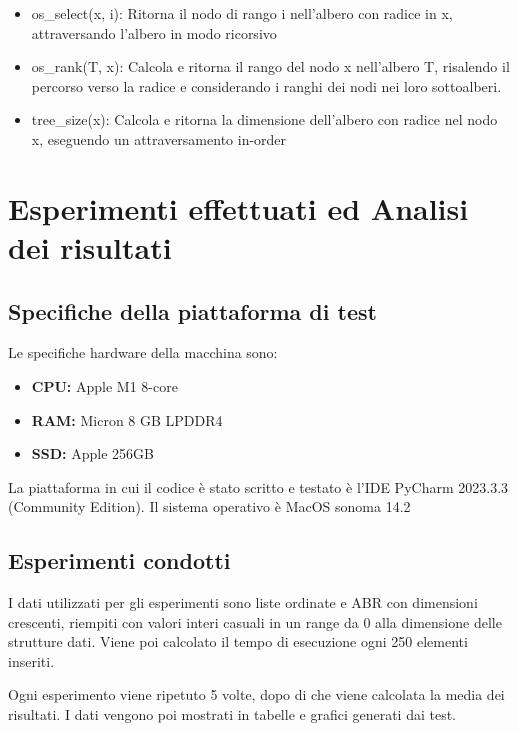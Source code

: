 \documentclass{article}
\begin{document}
\begin{itemize}
\begin{itemize}
        \item os\_select(x, i): Ritorna il nodo di rango i nell'albero con radice in x, attraversando l'albero in modo ricorsivo
        \item os\_rank(T, x): Calcola e ritorna il rango del nodo x nell'albero T, risalendo il percorso verso la radice e considerando i ranghi dei nodi nei loro sottoalberi.
        \item tree\_size(x): Calcola e ritorna la dimensione dell'albero con radice nel nodo x, eseguendo un attraversamento in-order
    \end{itemize}
\end{itemize}

\section{Esperimenti effettuati ed Analisi dei risultati}
\subsection{Specifiche della piattaforma di test}
Le specifiche hardware della macchina sono:
\begin{itemize}
    \item \textbf{CPU: } Apple M1 8-core
    \item \textbf{RAM: } Micron 8 GB LPDDR4
    \item \textbf{SSD: } Apple 256GB
\end{itemize}
La piattaforma in cui il codice è stato scritto e testato è l’IDE PyCharm 2023.3.3 (Community Edition).
Il sistema operativo è MacOS sonoma 14.2
\subsection{Esperimenti condotti}
I dati utilizzati per gli esperimenti sono liste ordinate e ABR con dimensioni crescenti, riempiti con valori interi casuali in un range da 0 alla dimensione delle strutture dati.
Viene poi calcolato il tempo di esecuzione ogni 250 elementi inseriti.

Ogni esperimento viene ripetuto 5 volte, dopo di che viene calcolata la media dei risultati. I dati vengono poi mostrati in tabelle e grafici generati dai test.
\end{document}
